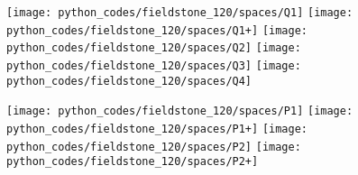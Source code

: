 \texttt{[image: python\_codes/fieldstone\_120/spaces/Q1]}
\texttt{[image: python\_codes/fieldstone\_120/spaces/Q1+]}
\texttt{[image: python\_codes/fieldstone\_120/spaces/Q2]}
\texttt{[image: python\_codes/fieldstone\_120/spaces/Q3]}
\texttt{[image: python\_codes/fieldstone\_120/spaces/Q4]}

\texttt{[image: python\_codes/fieldstone\_120/spaces/P1]}
\texttt{[image: python\_codes/fieldstone\_120/spaces/P1+]}
\texttt{[image: python\_codes/fieldstone\_120/spaces/P2]}
\texttt{[image: python\_codes/fieldstone\_120/spaces/P2+]}



